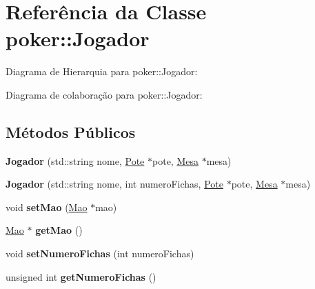 \hypertarget{classpoker_1_1Jogador}{}\section{Referência da Classe poker\+:\+:Jogador}
\label{classpoker_1_1Jogador}


Diagrama de Hierarquia para poker\+:\+:Jogador\+:


Diagrama de colaboração para poker\+:\+:Jogador\+:
\subsection*{Métodos Públicos}
\begin{DoxyCompactItemize}
\item 
\mbox{\label{classpoker_1_1Jogador_a634fc5eb88649561b158f3c2aba5722c}} 
{\bfseries Jogador} (std\+::string nome, \hyperlink{classpoker_1_1Pote}{Pote} $\ast$pote, \hyperlink{classpoker_1_1Mesa}{Mesa} $\ast$mesa)
\item 
\mbox{\label{classpoker_1_1Jogador_a3b2c80d9a24e1b120a427815bff645be}} 
{\bfseries Jogador} (std\+::string nome, int numero\+Fichas, \hyperlink{classpoker_1_1Pote}{Pote} $\ast$pote, \hyperlink{classpoker_1_1Mesa}{Mesa} $\ast$mesa)
\item 
\mbox{\label{classpoker_1_1Jogador_a6f6e7140314a3dc0a7d7323400654802}} 
void {\bfseries set\+Mao} (\hyperlink{classpoker_1_1Mao}{Mao} $\ast$mao)
\item 
\mbox{\label{classpoker_1_1Jogador_a58c8c2d24c24c66395f6afcb564fa100}} 
\hyperlink{classpoker_1_1Mao}{Mao} $\ast$ {\bfseries get\+Mao} ()
\item 
\mbox{\label{classpoker_1_1Jogador_ac5b827ed06ec90b86db65481cb9413da}} 
void {\bfseries set\+Numero\+Fichas} (int numero\+Fichas)
\item 
\mbox{\label{classpoker_1_1Jogador_a5c7ca3f9d69a0b7e3b26d5df84003040}} 
unsigned int {\bfseries get\+Numero\+Fichas} ()
\item 
\mbox{\label{classpoker_1_1Jogador_aa5c6ea943399895fd9ae9da8453e108c}} 

\end{DoxyCompactItemize}

